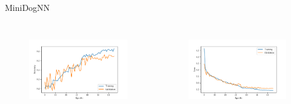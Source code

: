   \begin{frame}{MiniDogNN}
    \begin{columns}[c]
      \begin{figure}
        \centering
        \includegraphics[width=\textwidth]{logos/MiniDogNN/history_acc_mini.pdf}
        \label{fig:acc_mini}
      \end{figure}
      \begin{figure}
        \centering
        \includegraphics[width=\textwidth]{logos/MiniDogNN/history_loss_mini.pdf}
        \label{fig:loss_mini}
      \end{figure}
    \end{columns}
  \end{frame}

